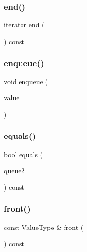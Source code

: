 \subsubsection{\texorpdfstring{end()}{end()}}
{\footnotesize\ttfamily iterator end (\begin{DoxyParamCaption}{ }\end{DoxyParamCaption}) const\hspace{0.3cm}{\ttfamily [inline]}}

\mbox{\label{classQueue_a663f69ed5d98f3f167202e9b2d7e7a9a}} 
\subsubsection{\texorpdfstring{enqueue()}{enqueue()}}
{\footnotesize\ttfamily void enqueue (\begin{DoxyParamCaption}\item[{const Value\+Type \&}]{value }\end{DoxyParamCaption})}

\mbox{\label{classQueue_aafa8534374662afc7fedc3e1ffb72c08}} 
\subsubsection{\texorpdfstring{equals()}{equals()}}
{\footnotesize\ttfamily bool equals (\begin{DoxyParamCaption}\item[{const \mbox{\hyperlink{classQueue}{Queue}}$<$ Value\+Type $>$ \&}]{queue2 }\end{DoxyParamCaption}) const}

\mbox{\label{classQueue_a02aaa52ad7a120201f6dd3e90eff737f}} 
\subsubsection{\texorpdfstring{front()}{front()}}
{\footnotesize\ttfamily const Value\+Type \& front (\begin{DoxyParamCaption}{ }\end{DoxyParamCaption}) const}

\mbox{\label{classQueue_acf82f9b2937375c7b1cf3dccb3df3312}} 
